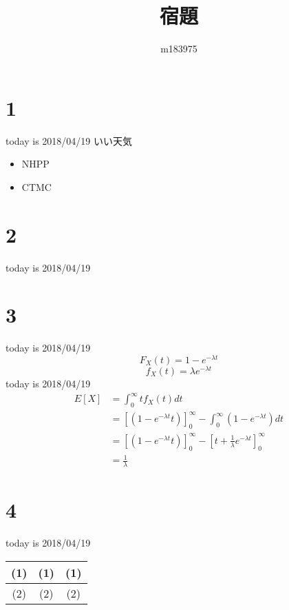 \documentclass[a4paper,12pt]{article}
\title{宿題}
\author{m183975}
\begin{document}
\maketitle
\section{1}
today is 2018/04/19 いい天気
\begin{itemize}
  \item NHPP
  \item CTMC
\end{itemize}
\section{2}
today is 2018/04/19 
\section{3}
today is 2018/04/19
\begin{equation}
  F_{X}(t) = 1-e^{-{\lambda}t}
\end{equation}
\begin{equation}
  f_{X}(t) = {\lambda}e^{-{\lambda}t}
\end{equation}
today is 2018/04/19
\begin{equation}
\begin{aligned}
E[X]&=\int_{0}^{\infty}tf_{X}(t)dt\\
&=[(1-e^{-{\lambda}t}t)]^\infty_{0}-\int_{0}^{\infty}(1-e^{-{\lambda}t})dt\\
&=[(1-e^{-{\lambda}t}t)]^\infty_{0}-[t+\frac{1}{\lambda}e^{-{\lambda}t}]^\infty_{0}\\
&=\frac{1}{\lambda}
\end{aligned}
\end{equation}
\section{4}
today is 2018/04/19\\
\begin{table}[!hbt]  
  \centering  
\begin{tabular}{|c|c|c|}
\hline  
(1)&(1)&(1)\\
\hline  
(2)&(2)&(2)\\
\hline 
\end{tabular}
\end{table} 
\end{document}
